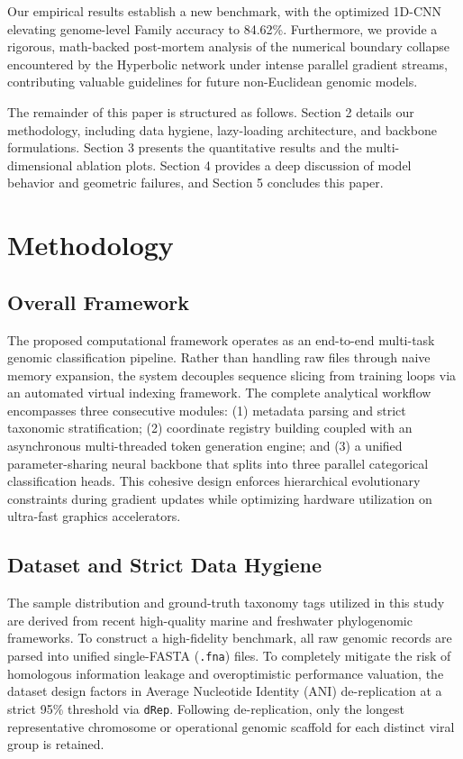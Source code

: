 \documentclass[11pt,a4paper]{article}
\begin{document}
Our empirical results establish a new benchmark, with the optimized 1D-CNN elevating genome-level Family accuracy to 84.62\%. Furthermore, we provide a rigorous, math-backed post-mortem analysis of the numerical boundary collapse encountered by the Hyperbolic network under intense parallel gradient streams, contributing valuable guidelines for future non-Euclidean genomic models.

The remainder of this paper is structured as follows. Section 2 details our methodology, including data hygiene, lazy-loading architecture, and backbone formulations. Section 3 presents the quantitative results and the multi-dimensional ablation plots. Section 4 provides a deep discussion of model behavior and geometric failures, and Section 5 concludes this paper.

\section{Methodology}

\subsection{Overall Framework}
The proposed computational framework operates as an end-to-end multi-task genomic classification pipeline. Rather than handling raw files through naive memory expansion, the system decouples sequence slicing from training loops via an automated virtual indexing framework. The complete analytical workflow encompasses three consecutive modules: (1) metadata parsing and strict taxonomic stratification; (2) coordinate registry building coupled with an asynchronous multi-threaded token generation engine; and (3) a unified parameter-sharing neural backbone that splits into three parallel categorical classification heads. This cohesive design enforces hierarchical evolutionary constraints during gradient updates while optimizing hardware utilization on ultra-fast graphics accelerators.

\subsection{Dataset and Strict Data Hygiene}
The sample distribution and ground-truth taxonomy tags utilized in this study are derived from recent high-quality marine and freshwater phylogenomic frameworks. To construct a high-fidelity benchmark, all raw genomic records are parsed into unified single-FASTA (\texttt{.fna}) files. To completely mitigate the risk of homologous information leakage and overoptimistic performance valuation, the dataset design factors in Average Nucleotide Identity (ANI) de-replication at a strict 95\% threshold via \texttt{dRep}. Following de-replication, only the longest representative chromosome or operational genomic scaffold for each distinct viral group is retained.
\end{document}
